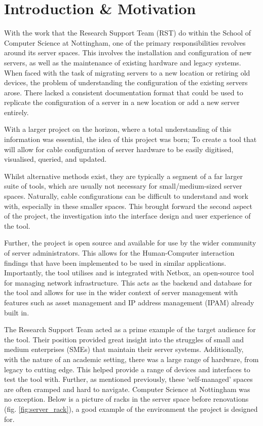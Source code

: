 \documentclass [11pt,a4paper]{article}
\begin{document}
\section{Introduction \& Motivation}
\label{sec:introduction}
With the work that the Research Support Team (RST) do within the School of Computer Science at Nottingham, one of the primary responsibilities revolves around its server spaces. This involves the installation and configuration of new servers, as well as the maintenance of existing hardware and legacy systems. When faced with the task of migrating servers to a new location or retiring old devices, the problem of understanding the configuration of the existing servers arose. There lacked a consistent documentation format that could be used to replicate the configuration of a server in a new location or add a new server entirely.

With a larger project on the horizon, where a total understanding of this information was essential, the idea of this project was born; To create a tool that will allow for cable configuration of server hardware to be easily digitised, visualised, queried, and updated.

Whilst alternative methods exist, they are typically a segment of a far larger suite of tools, which are usually not necessary for small/medium-sized server spaces. Naturally, cable configurations can be difficult to understand and work with, especially in these smaller spaces. This brought forward the second aspect of the project, the investigation into the interface design and user experience of the tool.

Further, the project is open source and available for use by the wider community of server administrators. This allows for the Human-Computer interaction findings that have been implemented to be used in similar applications. Importantly, the tool utilises and is integrated with Netbox\cite{Netbox}, an open-source tool for managing network infrastructure. This acts as the backend and database for the tool and allows for use in the wider context of server management with features such as asset management and IP address management (IPAM) already built in.

The Research Support Team acted as a prime example of the target audience for the tool. Their position provided great insight into the struggles of small and medium enterprises (SMEs) that maintain their server systems. Additionally, with the nature of an academic setting, there was a large range of hardware, from legacy to cutting edge. This helped provide a range of devices and interfaces to test the tool with. Further, as mentioned previously, these `self-managed' spaces are often cramped and hard to navigate. Computer Science at Nottingham was no exception. Below is a picture of racks in the server space before renovations (fig. \ref{fig:server_rack}), a good example of the environment the project is designed for.
\end{document}
